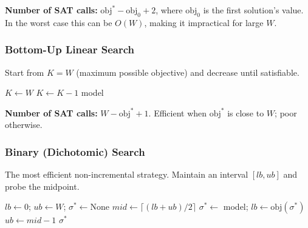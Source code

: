 \documentclass[11pt,a4paper]{article}
\begin{document}
\textbf{Number of SAT calls:} $\mathrm{obj}^* - \mathrm{obj}_0 + 2$,
where $\mathrm{obj}_0$ is the first solution's value.
In the worst case this can be $O(W)$, making it impractical for large $W$.

\subsubsection{Bottom-Up Linear Search}

Start from $K = W$ (maximum possible objective) and decrease until satisfiable.

\begin{algorithm}[H]
\caption{Non-Incremental Bottom-Up Linear Search (maximisation)}
\label{alg:bottomup}
\begin{algorithmic}[1]
\State $K \leftarrow W$
    \State $K \leftarrow K - 1$
\EndWhile
\State \Return model       
\end{algorithmic}
\end{algorithm}

\textbf{Number of SAT calls:} $W - \mathrm{obj}^* + 1$.
Efficient when $\mathrm{obj}^*$ is close to $W$; poor otherwise.

\subsubsection{Binary (Dichotomic) Search}

The most efficient non-incremental strategy.  Maintain an interval $[lb, ub]$
and probe the midpoint.

\begin{algorithm}[H]
\caption{Non-Incremental Binary Search (maximisation)}
\label{alg:binsearch}
\begin{algorithmic}[1]
\State $lb \leftarrow 0$;\;\; $ub \leftarrow W$;\;\; $\sigma^* \leftarrow \text{None}$
    \State $\mathit{mid} \leftarrow \lceil(lb + ub)/2\rceil$
        \State $\sigma^* \leftarrow$ model;\;\;
               $lb \leftarrow \mathrm{obj}(\sigma^*)$
    \Else
        \State $ub \leftarrow \mathit{mid} - 1$
    \EndIf
\EndWhile
\State \Return $\sigma^*$     
\end{algorithmic}
\end{algorithm}
\end{document}
